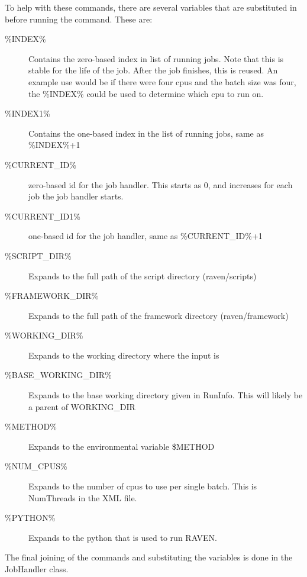 To help with these commands, there are several variables that are
substituted in before running the command.  These are:

\begin{description}
\item[\%INDEX\%]  Contains the zero-based index in list of running jobs.  Note that this is stable for the life of the job.  After the job finishes, this is reused.  An example use would be if there were four cpus and the batch size was four, the \%INDEX\% could be used to determine which cpu to run on.
\item[\%INDEX1\%] Contains the one-based index in the list of running jobs, same as \%INDEX\%+1
\item[\%CURRENT\_ID\%]  zero-based id for the job handler.  This starts as 0, and increases for each job the job handler starts.
\item[\%CURRENT\_ID1\%] one-based id for the job handler, same as \%CURRENT\_ID\%+1
\item[\%SCRIPT\_DIR\%] Expands to the full path of the script directory (raven/scripts)
\item[\%FRAMEWORK\_DIR\%]  Expands to the full path of the framework directory (raven/framework)
\item[\%WORKING\_DIR\%]  Expands to the working directory where the input is
\item[\%BASE\_WORKING\_DIR\%]  Expands to the base working directory given in RunInfo.  This will likely be a parent of WORKING\_DIR
\item[\%METHOD\%]  Expands to the environmental variable \$METHOD
\item[\%NUM\_CPUS\%]  Expands to the number of cpus to use per single batch.  This is NumThreads in the XML file.
\item[\%PYTHON\%] Expands to the python that is used to run RAVEN.

\end{description}

The final joining of the commands and substituting the variables is
done in the JobHandler class.

